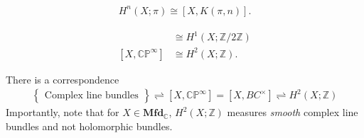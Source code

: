 \begin{theorem}

\begin{align*}
H^n(X; \pi) \cong [X, K( \pi, n) ]
.\end{align*}

\end{theorem}

\begin{example}[?]

\begin{align*}
[X, {\mathbb{RP}}^{\infty } ] &\cong H^1(X; {\mathbb{Z}}/2{\mathbb{Z}}) \\
[X, {\mathbb{CP}}^{\infty } ] &\cong H^2(X; {\mathbb{Z}})
.\end{align*}

\end{example}

\begin{proposition}[?]

There is a correspondence
\begin{align*}
\left\{{\substack{
  \text{Complex line bundles}
}}\right\}
\rightleftharpoons
[X, {\mathbb{CP}}^{\infty }] = [X, BC^{\times}]
\rightleftharpoons
H^2(X; {\mathbb{Z}})
\end{align*}
Importantly, note that for \(X \in {\mathbf{Mfd}}_{\mathbb{C}}\),
\(H^2(X; {\mathbb{Z}})\) measures \emph{smooth} complex line bundles and
not holomorphic bundles.

\end{proposition}

